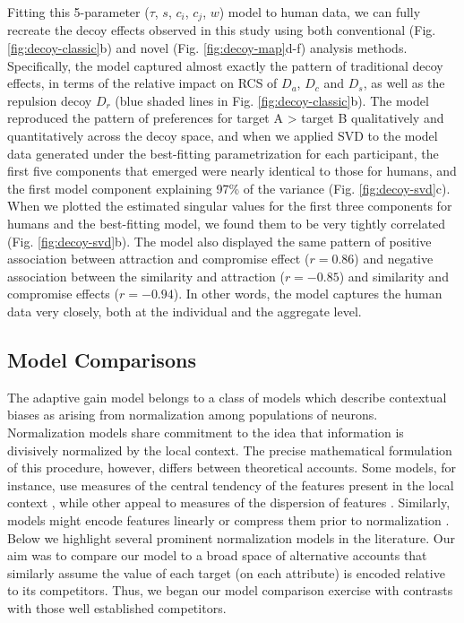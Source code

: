 \documentclass[a4paper, nobind]{templates/ociamthesis}
\begin{document}
Fitting this 5-parameter (\(\tau\), \(s\), \(c_i\), \(c_j\), \(w\)) model to human data, we can fully recreate the decoy effects observed in this study using both conventional (Fig. \ref{fig:decoy-classic}b) and novel (Fig. \ref{fig:decoy-map}d-f) analysis methods. Specifically, the model captured almost exactly the pattern of traditional decoy effects, in terms of the relative impact on RCS of \(D_a\), \(D_c\) and \(D_s\), as well as the repulsion decoy \(D_r\) (blue shaded lines in Fig. \ref{fig:decoy-classic}b). The model reproduced the pattern of preferences for target A \textgreater{} target B qualitatively and quantitatively across the decoy space, and when we applied SVD to the model data generated under the best-fitting parametrization for each participant, the first five components that emerged were nearly identical to those for humans, and the first model component explaining 97\% of the variance (Fig. \ref{fig:decoy-svd}c). When we plotted the estimated singular values for the first three components for humans and the best-fitting model, we found them to be very tightly correlated (Fig. \ref{fig:decoy-svd}b). The model also displayed the same pattern of positive association between attraction and compromise effect (\(r=0.86\)) and negative association between the similarity and attraction (\(r=-0.85\)) and similarity and compromise effects (\(r=-0.94\)). In other words, the model captures the human data very closely, both at the individual and the aggregate level.

\hypertarget{model-comparisons}{%
\subsection{Model Comparisons}\label{model-comparisons}}

The adaptive gain model belongs to a class of models which describe contextual biases as arising from normalization among populations of neurons. Normalization models share commitment to the idea that information is divisively normalized by the local context. The precise mathematical formulation of this procedure, however, differs between theoretical accounts. Some models, for instance, use measures of the central tendency of the features present in the local context \autocite[e.g.~the average of attribute values,][]{louie2013}, while other appeal to measures of the dispersion of features \autocite[e.g.~the range of attribute values,][]{soltani2012}. Similarly, models might encode features linearly \autocite[e.g.][]{bushong2021} or compress them prior to normalization \autocite[e.g.~via a logistic operation as in the model described here and in][]{rigoli2019}. Below we highlight several prominent normalization models in the literature. Our aim was to compare our model to a broad space of alternative accounts that similarly assume the value of each target (on each attribute) is encoded relative to its competitors. Thus, we began our model comparison exercise with contrasts with those well established competitors.
\end{document}
